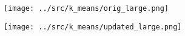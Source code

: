 \begin{answer}
    
    \begin{minipage}[t]{.49\linewidth}
        \centering
        \texttt{[image: ../src/k\_means/orig\_large.png]}
    \end{minipage}%
    \hfill
    \begin{minipage}[t]{.49\linewidth}
        \texttt{[image: ../src/k\_means/updated\_large.png]}
    \end{minipage}
\end{answer}
